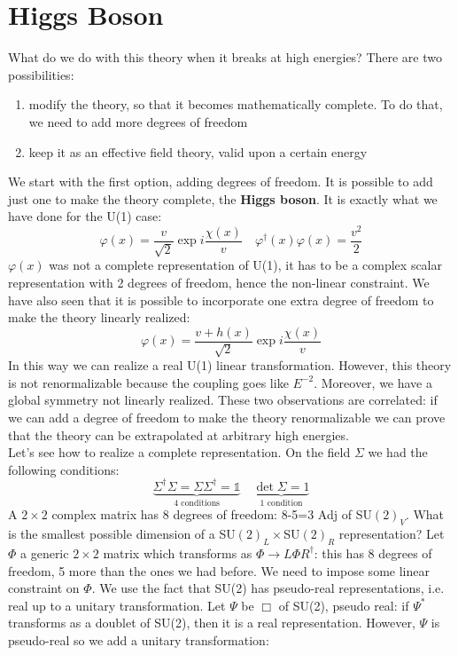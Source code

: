 \documentclass[../main.tex]{subfiles}
\begin{document}
\section{Higgs Boson}
What do we do with this theory when it breaks at high energies? There are two possibilities:
\begin{enumerate}
    \item modify the theory, so that it becomes mathematically complete. To do that, we need to add more degrees of freedom
    \item keep it as an effective field theory, valid upon a certain energy
\end{enumerate}
We start with the first option, adding degrees of freedom. It is possible to add just one to make the theory complete, the \textbf{Higgs boson}. It is exactly what we have done for the U(1) case:
\[
\varphi(x)=\frac{v}{\sqrt{2}}\exp{i\frac{\chi(x)}{v}} \quad \varphi^\dagger(x)\varphi(x)=\frac{v^2}{2}
\]
$\varphi(x)$ was not a complete representation of U(1), it has to be a complex scalar representation with 2 degrees of freedom, hence the non-linear constraint. We have also seen that it is possible to incorporate one extra degree of freedom to make the theory linearly realized:
\[
\varphi(x)=\frac{v+h(x)}{\sqrt{2}}\exp{i\frac{\chi(x)}{v}}
\]
In this way we can realize a real U(1) linear transformation. However, this theory is not renormalizable because the coupling goes like $E^{-2}$. Moreover, we have a global symmetry not linearly realized. These two observations are correlated: if we can add a degree of freedom to make the theory renormalizable we can prove that the theory can be extrapolated at arbitrary high energies. \\
Let's see how to realize a complete representation. On the field $\Sigma$ we had the following conditions:
\[
\underbrace{\Sigma^\dagger\Sigma=\Sigma\Sigma^\dagger=\mathbb{1}}_{\text{4 conditions}} \quad \underbrace{\det\Sigma=1}_{\text{1 condition}}
\]
A $2\times2$ complex matrix has 8 degrees of freedom: 8-5=3 Adj of SU$(2)_V$. What is the smallest possible dimension of a SU$(2)_L\times$SU$(2)_R$ representation? Let $\Phi$ a generic $2\times2$ matrix which transforms as $\Phi\to L\Phi R^\dagger$: this has 8 degrees of freedom, 5 more than the ones we had before. We need to impose some linear constraint on $\Phi$. We use the fact that SU(2) has pseudo-real representations, i.e. real up to a unitary transformation. Let $\Psi$ be $\Box$ of SU(2), pseudo real: if $\Psi^*$ transforms as a doublet of SU(2), then it is a real representation. However, $\Psi$ is pseudo-real so we add a unitary transformation:
\end{document}
